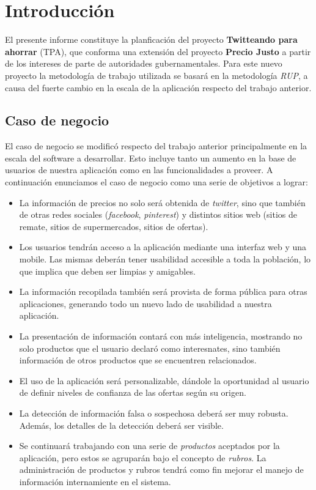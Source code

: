 \documentclass[10pt, a4paper]{article}
\begin{document}
\maketitle
\tableofcontents
\newpage

\section{Introducción}

El presente informe constituye la planficación del proyecto \textbf{Twitteando para ahorrar} (TPA), que conforma una extensión del proyecto \textbf{Precio Justo} a partir de los intereses de parte de autoridades gubernamentales. Para este nuevo proyecto la metodología de trabajo utilizada se basará en la metodología \emph{RUP}, a causa del fuerte cambio en la escala de la aplicación respecto del trabajo anterior.  

\subsection{Caso de negocio}

El caso de negocio se modificó respecto del trabajo anterior principalmente en la escala del software a desarrollar. Esto incluye tanto un aumento en la base de usuarios de nuestra aplicación como en las funcionalidades a proveer. A continuación enunciamos el caso de negocio como una serie de objetivos a lograr:

\begin{itemize}
\item La información de precios no solo será obtenida de \emph{twitter}, sino que también de otras redes sociales (\emph{facebook}, \emph{pinterest}) y distintos sitios web (sitios de remate, sitios de supermercados, sitios de ofertas).
\item Los usuarios tendrán acceso a la aplicación mediante una interfaz web y una mobile. Las mismas deberán tener usabilidad accesible a toda la población, lo que implica que deben ser limpias y amigables.
\item La información recopilada también será provista de forma pública para otras aplicaciones, generando todo un nuevo lado de usabilidad a nuestra aplicación.
\item La presentación de información contará con más inteligencia, mostrando no solo productos que el usuario declaró como interesnates, sino también información de otros productos que se encuentren relacionados.
\item El uso de la aplicación será personalizable, dándole la oportunidad al usuario de definir niveles de confianza de las ofertas según su origen.
\item La detección de información falsa o sospechosa deberá ser muy robusta. Además, los detalles de la detección deberá ser visible.
\item Se continuará trabajando con una serie de \emph{productos} aceptados por la aplicación, pero estos se agruparán bajo el concepto de \emph{rubros}. La administración de productos y rubros tendrá como fin mejorar el manejo de información internamiente en el sistema.
\end{itemize}
\end{document}
